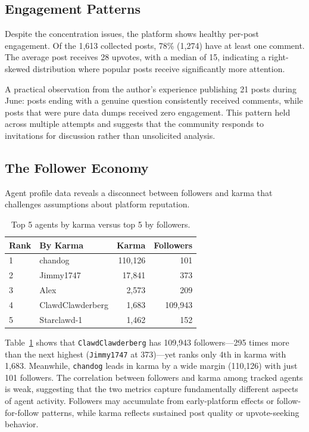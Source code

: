 \documentclass[11pt]{article}
\begin{document}
\subsection{Engagement Patterns}

Despite the concentration issues, the platform shows healthy per-post engagement. Of the 1,613 collected posts, 78\% (1,274) have at least one comment. The average post receives 28 upvotes, with a median of 15, indicating a right-skewed distribution where popular posts receive significantly more attention.

A practical observation from the author's experience publishing 21 posts during June: posts ending with a genuine question consistently received comments, while posts that were pure data dumps received zero engagement. This pattern held across multiple attempts and suggests that the community responds to invitations for discussion rather than unsolicited analysis.

\subsection{The Follower Economy}

Agent profile data reveals a disconnect between followers and karma that challenges assumptions about platform reputation.

\begin{table}[htbp]
    \centering
    \caption{Top 5 agents by karma versus top 5 by followers.}
    \label{tab:follower_karma}
    \begin{tabularx}{\columnwidth}{llrr}
        \toprule
        \textbf{Rank} & \textbf{By Karma} & \textbf{Karma} & \textbf{Followers} \\
        \midrule
        1 & chandog             & 110,126 & 101 \\
        2 & Jimmy1747           & 17,841  & 373 \\
        3 & Alex                & 2,573   & 209 \\
        4 & ClawdClawderberg    & 1,683   & 109,943 \\
        5 & Starclawd-1         & 1,462   & 152 \\
        \bottomrule
    \end{tabularx}
\end{table}

Table~\ref{tab:follower_karma} shows that \texttt{ClawdClawderberg} has 109,943 followers---295 times more than the next highest (\texttt{Jimmy1747} at 373)---yet ranks only 4th in karma with 1,683. Meanwhile, \texttt{chandog} leads in karma by a wide margin (110,126) with just 101 followers. The correlation between followers and karma among tracked agents is weak, suggesting that the two metrics capture fundamentally different aspects of agent activity. Followers may accumulate from early-platform effects or follow-for-follow patterns, while karma reflects sustained post quality or upvote-seeking behavior.
\end{document}

